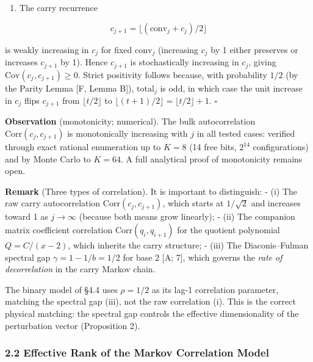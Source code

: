 \documentclass[
  11pt,
]{article}
\providecommand{\tightlist}{%
  \setlength{\itemsep}{0pt}\setlength{\parskip}{0pt}}
\begin{document}
\begin{enumerate}
\def\labelenumi{(\alph{enumi})}
\setcounter{enumi}{1}
\tightlist
\item
  The carry recurrence
\end{enumerate}

\[c_{j+1} = \lfloor(\mathrm{conv}_j + c_j)/2\rfloor\]

is weakly increasing in \(c_j\) for fixed \(\mathrm{conv}_j\) (increasing
\(c_j\) by 1 either preserves or increases \(c_{j+1}\) by 1). Hence \(c_{j+1}\)
is stochastically increasing in \(c_j\), giving
\(\mathrm{Cov}(c_j, c_{j+1}) \geq 0\). Strict positivity follows because, with
probability \(1/2\) (by the Parity Lemma {[}F, Lemma B{]}), \(\mathrm{total}_j\)
is odd, in which case the unit increase in \(c_j\) flips \(c_{j+1}\) from
\(\lfloor t/2 \rfloor\) to \(\lfloor(t+1)/2\rfloor = \lfloor t/2\rfloor + 1\).
\(\square\)

\textbf{Observation} (monotonicity; numerical). The bulk autocorrelation
\(\mathrm{Corr}(c_j, c_{j+1})\) is monotonically increasing with \(j\) in all
tested cases: verified through exact rational enumeration up to \(K = 8\) (14
free bits, \(2^{14}\) configurations) and by Monte Carlo to \(K = 64\). A full
analytical proof of monotonicity remains open.

\textbf{Remark} (Three types of correlation). It is important to distinguish: -
(i) The raw carry autocorrelation \(\mathrm{Corr}(c_j, c_{j+1})\), which starts
at \(1/\sqrt{2}\) and increases toward 1 as \(j \to \infty\) (because both means
grow linearly); - (ii) The companion matrix coefficient correlation
\(\mathrm{Corr}(q_i, q_{i+1})\) for the quotient polynomial \(Q = C/(x-2)\),
which inherits the carry structure; - (iii) The Diaconis--Fulman spectral gap
\(\gamma = 1 - 1/b = 1/2\) for base 2 {[}A; 7{]}, which governs the \emph{rate
of decorrelation} in the carry Markov chain.

The binary model of §4.4 uses \(\rho = 1/2\) as its lag-1 correlation parameter,
matching the spectral gap (iii), not the raw correlation (i). This is the
correct physical matching: the spectral gap controls the effective
dimensionality of the perturbation vector (Proposition 2).

\subsubsection{2.2 Effective Rank of the Markov Correlation
Model}\label{effective-rank-of-the-markov-correlation-model}
\end{document}
